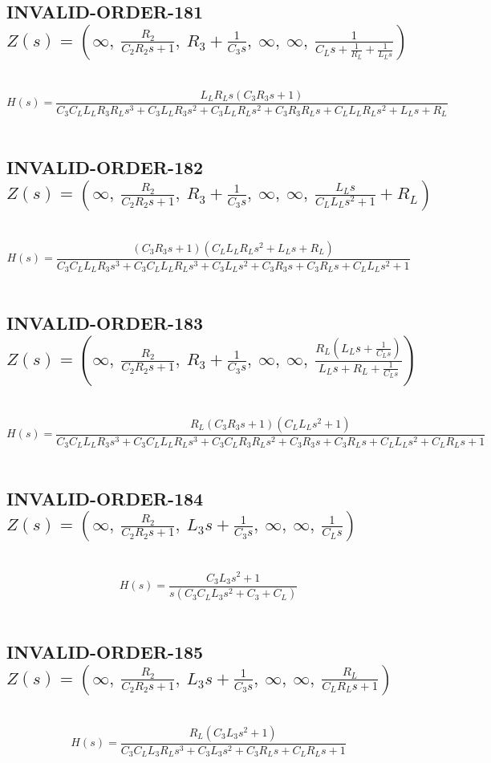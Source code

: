 \documentclass{article}
\begin{document}
\subsection{INVALID-ORDER-181 $Z(s) = \left( \infty, \  \frac{R_{2}}{C_{2} R_{2} s + 1}, \  R_{3} + \frac{1}{C_{3} s}, \  \infty, \  \infty, \  \frac{1}{C_{L} s + \frac{1}{R_{L}} + \frac{1}{L_{L} s}}\right)$ } \ 
\textbf{\[H(s) = \frac{L_{L} R_{L} s \left(C_{3} R_{3} s + 1\right)}{C_{3} C_{L} L_{L} R_{3} R_{L} s^{3} + C_{3} L_{L} R_{3} s^{2} + C_{3} L_{L} R_{L} s^{2} + C_{3} R_{3} R_{L} s + C_{L} L_{L} R_{L} s^{2} + L_{L} s + R_{L}}\] } \ 
\subsection{INVALID-ORDER-182 $Z(s) = \left( \infty, \  \frac{R_{2}}{C_{2} R_{2} s + 1}, \  R_{3} + \frac{1}{C_{3} s}, \  \infty, \  \infty, \  \frac{L_{L} s}{C_{L} L_{L} s^{2} + 1} + R_{L}\right)$ } \ 
\textbf{\[H(s) = \frac{\left(C_{3} R_{3} s + 1\right) \left(C_{L} L_{L} R_{L} s^{2} + L_{L} s + R_{L}\right)}{C_{3} C_{L} L_{L} R_{3} s^{3} + C_{3} C_{L} L_{L} R_{L} s^{3} + C_{3} L_{L} s^{2} + C_{3} R_{3} s + C_{3} R_{L} s + C_{L} L_{L} s^{2} + 1}\] } \ 
\subsection{INVALID-ORDER-183 $Z(s) = \left( \infty, \  \frac{R_{2}}{C_{2} R_{2} s + 1}, \  R_{3} + \frac{1}{C_{3} s}, \  \infty, \  \infty, \  \frac{R_{L} \left(L_{L} s + \frac{1}{C_{L} s}\right)}{L_{L} s + R_{L} + \frac{1}{C_{L} s}}\right)$ } \ 
\textbf{\[H(s) = \frac{R_{L} \left(C_{3} R_{3} s + 1\right) \left(C_{L} L_{L} s^{2} + 1\right)}{C_{3} C_{L} L_{L} R_{3} s^{3} + C_{3} C_{L} L_{L} R_{L} s^{3} + C_{3} C_{L} R_{3} R_{L} s^{2} + C_{3} R_{3} s + C_{3} R_{L} s + C_{L} L_{L} s^{2} + C_{L} R_{L} s + 1}\] } \ 
\subsection{INVALID-ORDER-184 $Z(s) = \left( \infty, \  \frac{R_{2}}{C_{2} R_{2} s + 1}, \  L_{3} s + \frac{1}{C_{3} s}, \  \infty, \  \infty, \  \frac{1}{C_{L} s}\right)$ } \ 
\textbf{\[H(s) = \frac{C_{3} L_{3} s^{2} + 1}{s \left(C_{3} C_{L} L_{3} s^{2} + C_{3} + C_{L}\right)}\] } \ 
\subsection{INVALID-ORDER-185 $Z(s) = \left( \infty, \  \frac{R_{2}}{C_{2} R_{2} s + 1}, \  L_{3} s + \frac{1}{C_{3} s}, \  \infty, \  \infty, \  \frac{R_{L}}{C_{L} R_{L} s + 1}\right)$ } \ 
\textbf{\[H(s) = \frac{R_{L} \left(C_{3} L_{3} s^{2} + 1\right)}{C_{3} C_{L} L_{3} R_{L} s^{3} + C_{3} L_{3} s^{2} + C_{3} R_{L} s + C_{L} R_{L} s + 1}\] } \ 
\end{document}
